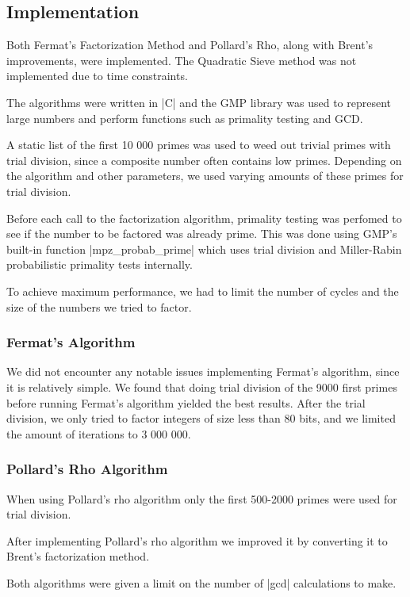 \documentclass[paper=a4, fontsize=11pt,numbers=endperiod]{scrartcl} %
\numberwithin{equation}{section} %
\numberwithin{figure}{section} %
\numberwithin{table}{section} %
\begin{document}

\subsection{Implementation}
Both Fermat's Factorization Method and Pollard's Rho, along with Brent's improvements, were implemented.
The Quadratic Sieve method was not implemented due to time constraints.

The algorithms were written in |C| and the GMP \cite{gmp} library was used to represent large numbers and perform functions such as primality testing and GCD.

A static list of the first 10 000 primes was used to weed out trivial primes with trial division, since a composite number often contains low primes.
Depending on the algorithm and other parameters, we used varying amounts of these primes for trial division.

Before each call to the factorization algorithm, primality testing was perfomed to see if the number to be factored was already prime.
This was done using GMP's built-in function |mpz_probab_prime| which uses trial division and Miller-Rabin probabilistic primality tests internally\cite{probabprime}.

To achieve maximum performance, we had to limit the number of cycles and the size of the numbers we tried to factor.

\subsubsection{Fermat's Algorithm}
We did not encounter any notable issues implementing Fermat's algorithm, since it is relatively simple.
We found that doing trial division of the 9000 first primes before running Fermat's algorithm yielded the best results.
After the trial division, we only tried to factor integers of size less than 80 bits, and we limited the amount of iterations to 3 000 000.

\subsubsection{Pollard's Rho Algorithm}
When using Pollard's rho algorithm only the first 500-2000 primes were used for trial division.


After implementing Pollard's rho algorithm we improved it by converting it to Brent's factorization method.

Both algorithms were given a limit on the number of |gcd| calculations to make. %
\end{document}

